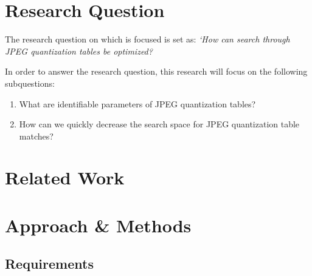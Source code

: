 \documentclass[a4paper,8pt]{article}
\begin{document}





\section*{Research Question}

The research question on which is focused is set as: \textit{`How can search through JPEG quantization tables be optimized?}

In order to answer the research question, this research will focus on the following subquestions:
\begin{enumerate}
\item What are identifiable parameters of JPEG quantization tables?
\item How can we quickly decrease the search space for JPEG quantization table matches?
\end{enumerate}

\section*{Related Work}




\section*{Approach \& Methods}

\subsection*{Requirements}
\end{document}
